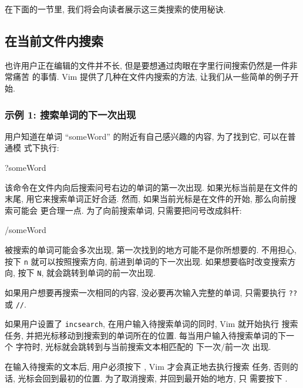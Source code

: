在下面的一节里, 我们将会向读者展示这三类搜索的使用秘诀.

\subsection{在当前文件内搜索}
\label{subsec:search_the_current_file}

也许用户正在编辑的文件并不长, 但是要想通过肉眼在字里行间搜索仍然是一件非常痛苦
的事情. Vim 提供了几种在文件内搜索的方法, 让我们从一些简单的例子开始.

\subsubsection{示例 1: 搜索单词的下一次出现}
\label{subsubsec:example_1_find_the_next_occurrence_of_a_word}

用户知道在单词 ``someWord'' 的附近有自己感兴趣的内容, 为了找到它, 可以在普通模
式下执行:
\begin{vimcmd}
?someWord
\end{vimcmd}
该命令在文件内向后搜索问号右边的单词的第一次出现. 如果光标当前是在文件的末尾,
用它来搜索单词正好合适. 然而, 如果当前光标是在文件的开始, 那么向前搜索可能会
更合理一点. 为了向前搜索单词, 只需要把问号改成斜杆:
\begin{vimcmd}
/someWord
\end{vimcmd}
被搜索的单词可能会多次出现, 第一次找到的地方可能不是你所想要的. 不用担心, 按下 
\texttt{n} 就可以按照搜索方向, 前进到单词的下一次出现. 如果想要临时改变搜索方向,
按下 \texttt{N}, 就会跳转到单词的前一次出现.

如果用户想要再搜索一次相同的内容, 没必要再次输入完整的单词, 只需要执行
\texttt{??} 或 \texttt{//}.

如果用户设置了 \texttt{incsearch}, 在用户输入待搜索单词的同时, Vim 就开始执行
搜索任务, 并把光标移动到搜索到的单词所在的位置. 每当用户输入待搜索单词的下一个
字符时, 光标就会跳转到与当前搜索文本相匹配的 下一次/前一次 出现.

\begin{warning}
    在输入待搜索的文本后, 用户必须按下 , Vim 才会真正地去执行搜索
    任务, 否则的话, 光标会回到最初的位置. 为了取消搜索, 并回到最开始的地方, 只
    需要按下 .
\end{warning}
